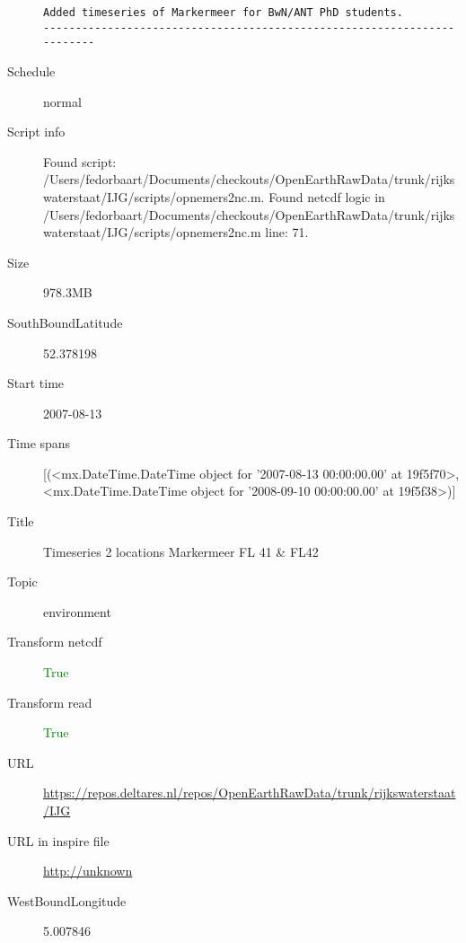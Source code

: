 \documentclass[9]{report}
\begin{document}
\begin{description}
\begin{verbatim}
Added timeseries of Markermeer for BwN/ANT PhD students.
------------------------------------------------------------------------

\end{verbatim}
  \item[Schedule] normal
  \item[Script info] Found script: /Users/fedorbaart/Documents/checkouts/OpenEarthRawData/trunk/rijkswaterstaat/IJG/scripts/opnemers2nc.m.
Found netcdf logic in /Users/fedorbaart/Documents/checkouts/OpenEarthRawData/trunk/rijkswaterstaat/IJG/scripts/opnemers2nc.m line: 71.
  \item[Size] 978.3MB
  \item[SouthBoundLatitude] 52.378198
  \item[Start time] 2007-08-13
  \item[Time spans] [(<mx.DateTime.DateTime object for '2007-08-13 00:00:00.00' at 19f5f70>, <mx.DateTime.DateTime object for '2008-09-10 00:00:00.00' at 19f5f38>)]
  \item[Title]  Timeseries 2 locations Markermeer FL 41 \& FL42 
  \item[Topic] environment
  \item[Transform netcdf] \textcolor{green}{True}
  \item[Transform read] \textcolor{green}{True}
  \item[URL] \href{https://repos.deltares.nl/repos/OpenEarthRawData/trunk/rijkswaterstaat/IJG}{https://repos.deltares.nl/repos/OpenEarthRawData/trunk/rijkswaterstaat/IJG}
  \item[URL in inspire file] \href{http://unknown}{http://unknown}
  \item[WestBoundLongitude] 5.007846
\end{description}
\end{document}
